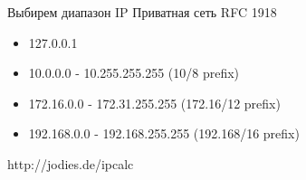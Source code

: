 
\begin{frame}{Выбирем диапазон IP}
Приватная сеть RFC 1918
	\begin{itemize}
		\item 127.0.0.1
		\item 10.0.0.0        -   10.255.255.255  (10/8 prefix)
		\item 172.16.0.0      -   172.31.255.255  (172.16/12 prefix)
		\item 192.168.0.0     -   192.168.255.255 (192.168/16 prefix)
	\end{itemize}
	http://jodies.de/ipcalc
\end{frame}
